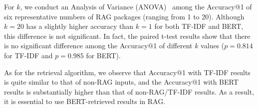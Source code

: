 For $k$, we conduct an Analysis of Variance (ANOVA)~\cite{anova} among the Accuracy@1 of six representative numbers of RAG packages (ranging from 1 to 20). Although $k=20$ has a slightly higher accuracy than $k=1$ for both TF-IDF and BERT, this difference is not significant. In fact, the paired t-test results show that there is no significant difference among the Accuracy@1 of different $k$ values ($p=0.814$ for TF-IDF and $p=0.985$ for BERT). 

As for the retrieval algorithm, we observe that Accuracy@1 with TF-IDF results is quite similar to that of non-RAG inputs, and the Accuracy@1 with BERT results is substantially higher than that of non-RAG/TF-IDF results. As a result, it is essential to use BERT-retrieved results in RAG. 





